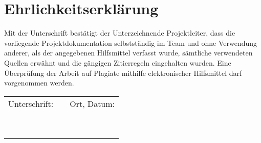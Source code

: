 \section{Ehrlichkeitserklärung}\label{sec:Ehrlichkeitserklärung}
Mit der Unterschrift bestätigt der Unterzeichnende Projektleiter, dass die vorliegende Projektdokumentation selbstständig im Team und ohne Verwendung anderer, als der angegebenen Hilfsmittel verfasst wurde, sämtliche verwendeten Quellen erwähnt und die gängigen Zitierregeln eingehalten wurden. Eine Überprüfung der Arbeit auf Plagiate mithilfe elektronischer Hilfsmittel darf vorgenommen werden.


\vspace{20mm}


\begin{center}
		\renewcommand{\arraystretch}{1}
	\begin{tabular}{lp{5em}l} 
  
		
		Unterschrift:   && Ort, Datum: \\
		&&\\
		\hspace{5cm}   && \hspace{5cm} \\\cline{1-1}\cline{3-3}
		&&\\
		&&\\
		

  
  \ \\
 \end{tabular}
 \end{center}




